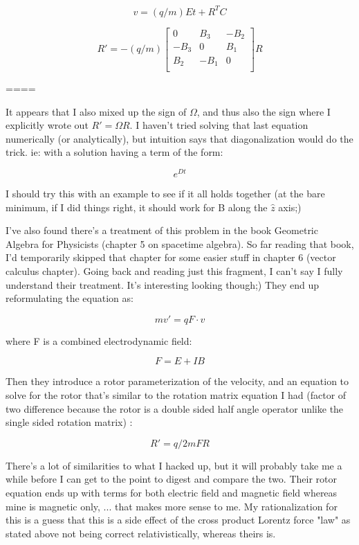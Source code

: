 \documentclass{article}      %
\begin{document}
\[
v = (q/m) E t + R^T C
\]

\[
R' = -(q/m)
\begin{bmatrix}
0 & B_3 & -B_2 \\
-B_3 & 0 & B_1 \\
B_2 & -B_1 & 0 \\
\end{bmatrix}
R
\]

====

It appears that I also mixed up the sign of $\Omega$, and thus also the sign where I explicitly wrote out $R' = \Omega R$.  I haven't tried solving that last equation numerically (or analytically), but intuition says that diagonalization would do the trick.  ie: with a solution having a term of the form:

\[
e^{Dt}
\]

I should try this with an example to see if it all holds together (at the bare minimum, if I did things right, it should work for B along the $\hat{z}$ axis;)

I've also found there's a treatment of this problem in the book Geometric Algebra for Physicists (chapter 5 on spacetime algebra).  So far reading that book, I'd temporarily skipped that chapter for some easier stuff in chapter 6 (vector calculus chapter).  Going back and reading just this fragment, I can't say I fully understand their treatment.  It's interesting looking though;)  They end up reformulating the equation as:

\[
m v' = q F \cdot v
\]

where F is a combined electrodynamic field:

\[
F = E + I B
\]

Then they introduce a rotor parameterization of the velocity, and an equation to solve for the rotor that's similar to the rotation matrix equation I had (factor of two difference because the rotor is a double sided half angle operator unlike the single sided rotation matrix) :

\[
R' = q/2m F R
\]

There's a lot of similarities to what I hacked up, but it will probably take me a while before I can get to the point to digest and compare the two.   Their rotor equation ends up with terms for both electric field and magnetic field whereas mine is magnetic only, ... that makes more sense to me.  My rationalization for this is a guess that this is a side effect of the cross product Lorentz force "law" as stated above not being correct relativistically, whereas theirs is.
\end{document}
